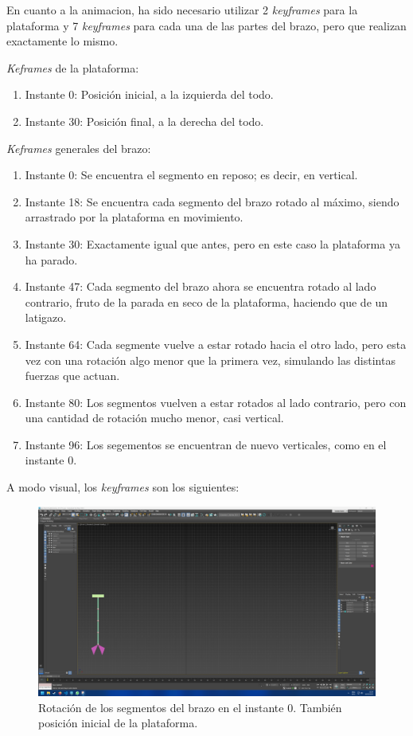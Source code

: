 \documentclass{article}
\begin{document}
En cuanto a la animacion, ha sido necesario utilizar 2 \textit{keyframes} para la plataforma y 7 \textit{keyframes} para cada una de las partes del brazo, pero que realizan exactamente lo mismo. 

\textit{Keframes} de la plataforma:


\begin{enumerate}
    \item Instante 0: Posición inicial, a la izquierda del todo.
    \item Instante 30: Posición final, a la derecha del todo.
\end{enumerate}

\textit{Keframes} generales del brazo:

\begin{enumerate}
    \item Instante 0: Se encuentra el segmento en reposo; es decir, en vertical.
    \item Instante 18: Se encuentra cada segmento del brazo rotado al máximo, siendo arrastrado por la plataforma en movimiento.
    \item Instante 30: Exactamente igual que antes, pero en este caso la plataforma ya ha parado.
    \item Instante 47: Cada segmento del brazo ahora se encuentra rotado al lado contrario, fruto de la parada en seco de la plataforma, haciendo que de un latigazo.
    \item Instante 64: Cada segmente vuelve a estar rotado hacia el otro lado, pero esta vez con una rotación algo menor que la primera vez, simulando las distintas fuerzas que actuan.
    \item Instante 80: Los segmentos vuelven a estar rotados al lado contrario, pero con una cantidad de rotación mucho menor, casi vertical.
    \item Instante 96: Los segementos se encuentran de nuevo verticales, como en el instante 0.
\end{enumerate}

A modo visual, los \textit{keyframes} son los siguientes:

\begin{figure}[H]
    \centering
    \includegraphics[width=\textwidth]{imagenes/Ejercicio4/keyframes/0.png}
    \caption{Rotación de los segmentos del brazo en el instante 0. También posición inicial de la plataforma.}
\end{figure}
\end{document}
